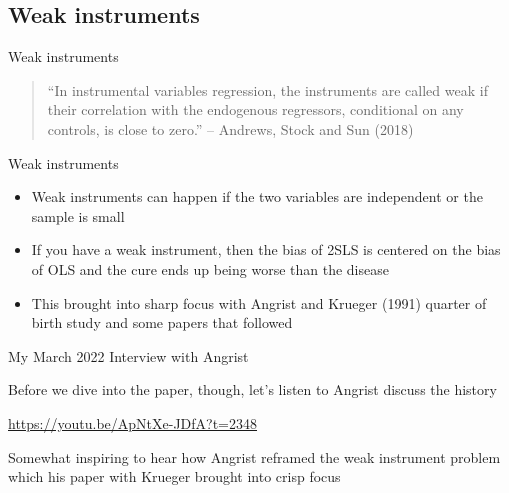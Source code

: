 \documentclass{beamer}
\begin{document}
\subsection{Weak instruments}

\begin{frame}{Weak instruments}

\begin{quote}
``In instrumental variables regression, the instruments are called weak if their correlation with the endogenous regressors, conditional on any controls, is close to zero.'' -- Andrews, Stock and Sun (2018)
\end{quote}

\end{frame}

\begin{frame}{Weak instruments}

\begin{itemize}
\item Weak instruments can happen if the two variables are independent or the sample is small
\item If you have a weak instrument, then the bias of 2SLS is centered on the bias of OLS and the cure ends up being worse than the disease
\item This brought into sharp focus with Angrist and Krueger (1991) quarter of birth study and some papers that followed
\end{itemize}

\end{frame}

\begin{frame}{My March 2022 Interview with Angrist}

Before we dive into the paper, though, let's listen to Angrist discuss the history

\bigskip

\url{https://youtu.be/ApNtXe-JDfA?t=2348}

\bigskip

Somewhat inspiring to hear how Angrist reframed the weak instrument problem which his paper with Krueger brought into crisp focus

\end{frame}
\end{document}
